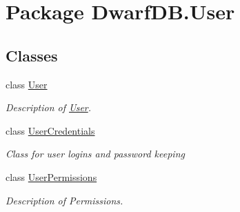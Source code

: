 \hypertarget{namespace_dwarf_d_b_1_1_user}{\section{Package Dwarf\+D\+B.\+User}
\label{namespace_dwarf_d_b_1_1_user}
}
\subsection*{Classes}
\begin{DoxyCompactItemize}
\item 
class \hyperlink{class_dwarf_d_b_1_1_user_1_1_user}{User}
\begin{DoxyCompactList}\small\item\em Description of \hyperlink{class_dwarf_d_b_1_1_user_1_1_user}{User}. \end{DoxyCompactList}\item 
class \hyperlink{class_dwarf_d_b_1_1_user_1_1_user_credentials}{User\+Credentials}
\begin{DoxyCompactList}\small\item\em Class for user logins and password keeping \end{DoxyCompactList}\item 
class \hyperlink{class_dwarf_d_b_1_1_user_1_1_user_permissions}{User\+Permissions}
\begin{DoxyCompactList}\small\item\em Description of Permissions. \end{DoxyCompactList}\end{DoxyCompactItemize}
